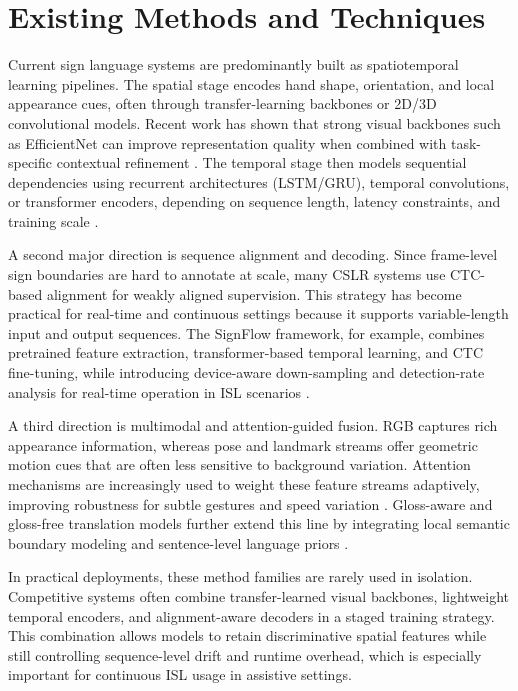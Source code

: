\section{Existing Methods and Techniques}
Current sign language systems are predominantly built as spatiotemporal learning pipelines. The spatial stage encodes hand shape, orientation, and local appearance cues, often through transfer-learning backbones or 2D/3D convolutional models. Recent work has shown that strong visual backbones such as EfficientNet can improve representation quality when combined with task-specific contextual refinement \cite{yenisari2025deep}. The temporal stage then models sequential dependencies using recurrent architectures (LSTM/GRU), temporal convolutions, or transformer encoders, depending on sequence length, latency constraints, and training scale \cite{camgoz2020transformers,zhou2024transformer}.

A second major direction is sequence alignment and decoding. Since frame-level sign boundaries are hard to annotate at scale, many CSLR systems use CTC-based alignment for weakly aligned supervision. This strategy has become practical for real-time and continuous settings because it supports variable-length input and output sequences. The SignFlow framework, for example, combines pretrained feature extraction, transformer-based temporal learning, and CTC fine-tuning, while introducing device-aware down-sampling and detection-rate analysis for real-time operation in ISL scenarios \cite{geetha2025toward}.

A third direction is multimodal and attention-guided fusion. RGB captures rich appearance information, whereas pose and landmark streams offer geometric motion cues that are often less sensitive to background variation. Attention mechanisms are increasingly used to weight these feature streams adaptively, improving robustness for subtle gestures and speed variation \cite{yenisari2025deep,geetha2025toward}. Gloss-aware and gloss-free translation models further extend this line by integrating local semantic boundary modeling and sentence-level language priors \cite{yin2023gaslt,zhang2024scaling}.

In practical deployments, these method families are rarely used in isolation. Competitive systems often combine transfer-learned visual backbones, lightweight temporal encoders, and alignment-aware decoders in a staged training strategy. This combination allows models to retain discriminative spatial features while still controlling sequence-level drift and runtime overhead, which is especially important for continuous ISL usage in assistive settings.

